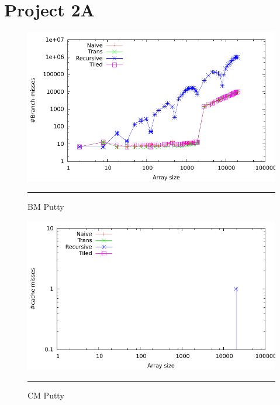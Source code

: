 \section{Project 2A}

\begin{figure}[htbp]
	\centering
		\includegraphics[width=\textwidth]{./Appendices/Figures/Project2a/Branch_misses_putty.pdf}
		\rule{35em}{0.5pt}
	\caption[Branch misses]{
	BM Putty
	}
	\label{fig:Branch_misses_p2putty}
\end{figure}
\begin{figure}[htbp]
	\centering
		\includegraphics[width=\textwidth]{./Appendices/Figures/Project2a/Cache_misses_putty.pdf}
		\rule{35em}{0.5pt}
	\caption[Cache misses]{
	CM Putty
	}
	\label{fig:Cache_misses_p2putty}
\end{figure}
